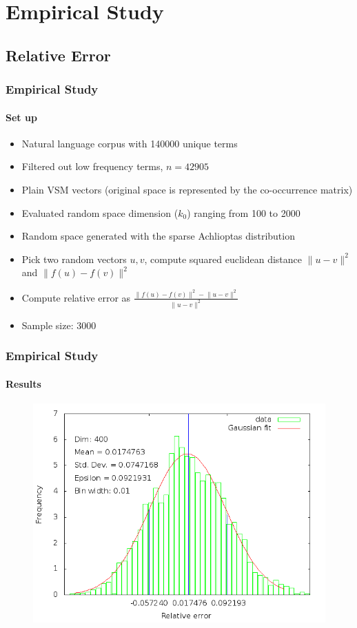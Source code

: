 \documentclass{beamer}
\begin{document}
\section{Empirical Study}
\subsection{Relative Error}

\begin{frame}
\frametitle{Empirical Study}
\framesubtitle{Set up}
\begin{itemize}
  \item Natural language corpus with 140000 unique terms
  \item Filtered out low frequency terms, $n=42905$
  \item Plain VSM vectors (original space is represented by the co-occurrence matrix)
  \item Evaluated random space dimension ($k_{0}$) ranging from 100 to 2000
  \item Random space generated with the sparse Achlioptas distribution
  \item Pick two random vectors $u, v$, compute squared euclidean distance $\lVert u-v \rVert^{2}$ and $\lVert f(u)-f(v) \rVert^{2}$
  \item Compute relative error as $\frac{\lVert f(u)-f(v) \rVert^{2}-\lVert u-v \rVert^{2}}{\lVert u-v \rVert^{2}}$ 
  \item Sample size: $3000$
  
\end{itemize}
\end{frame}


\begin{frame}
\frametitle{Empirical Study}
\framesubtitle{Results}
  		\begin{figure}
		\includegraphics[scale=0.46]{histogram400.png}
	\end{figure}
\end{frame}
\end{document}
